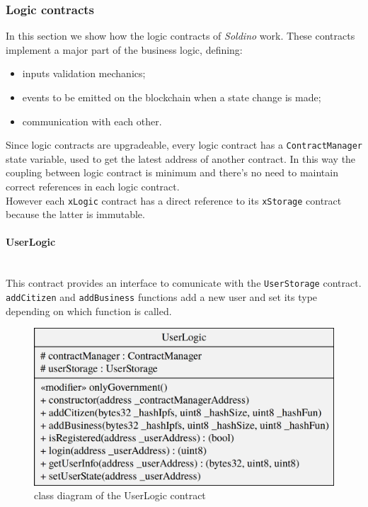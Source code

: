\subsubsection{Logic contracts}
In this section we show how the logic contracts of \textit{Soldino} work. These contracts implement a major part of the business logic, defining:
\begin{itemize}
	\item inputs validation mechanics;
	\item events to be emitted on the blockchain when a state change is made;
	\item communication with each other.
\end{itemize}
Since logic contracts are upgradeable, every logic contract has a \texttt{ContractManager} state variable, used to get the latest address of another contract. In this way the coupling between logic contract is minimum and there's no need to maintain correct references in each logic contract.\\
However each \texttt{xLogic} contract has a direct reference to its \texttt{xStorage} contract because the latter is immutable.
\pagebreak
\paragraph{UserLogic}\mbox{}\\

\noindent This contract provides an interface to comunicate with the \texttt{UserStorage} contract. \texttt{addCitizen} and \texttt{addBusiness} functions add a new user and set its type depending on which function is called.
\begin{figure}[H]
	\centering
	\includegraphics[scale=0.20]{res/images/solidity/userlogic.png}
	\caption{class diagram of the UserLogic contract}
\end{figure}

